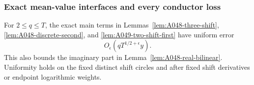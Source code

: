 \subsubsection*{Exact mean-value interfaces and every conductor loss}

\begin{lemma}
\label{lem:A049-uniform-interfaces}
For $2\le q\le T$, the exact main terms in
Lemmas~\ref{lem:A048-three-shift},
\ref{lem:A048-discrete-second}, and
\ref{lem:A049-two-shift-first} have uniform error
\[
                         O_\epsilon(qT^{1/2+\epsilon}y).
\tag{A049u.9}
\]
This also bounds the imaginary part in
Lemma~\ref{lem:A048-real-bilinear}. Uniformity holds on the
fixed distinct shift circles and after fixed shift
derivatives or endpoint logarithmic weights.
\end{lemma}

